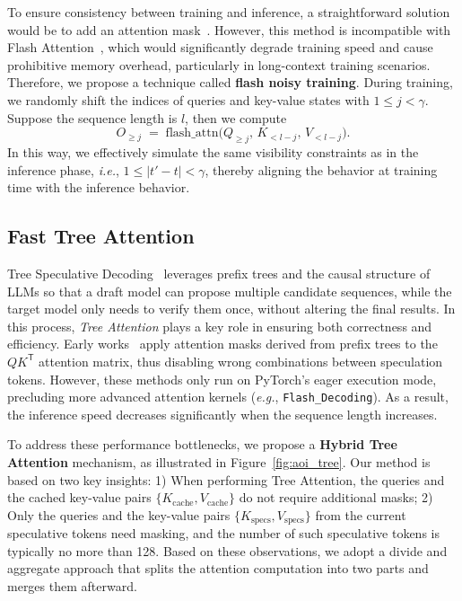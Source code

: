 To ensure consistency between training and inference, a straightforward solution would be to add an attention mask~\cite{du2024glide}. However, this method is incompatible with Flash Attention~\cite{dao2023flash}, which would significantly degrade training speed and cause prohibitive memory overhead, particularly in long-context training scenarios. Therefore, we propose a technique called \textbf{flash noisy training}. During training, we randomly shift the indices of queries and key-value states with $1 \le j < \gamma$. 
Suppose the sequence length is $l$, then we compute
\[
    O_{\geq j} 
    \;=\; \mathrm{flash\_attn}\bigl(Q_{\geq j}, \,K_{< l-j}, \,V_{< l-j}\bigr).
\]
In this way, we effectively simulate the same visibility constraints as in the inference phase, \emph{i.e.}, 
$ 1\le|t' - t|<\gamma$,
thereby aligning the behavior at training time with the inference behavior.

\subsection{Fast Tree Attention}

\label{subsec: tree attention}
Tree Speculative Decoding~\cite{miao2024specinfer} leverages prefix trees and the causal structure of LLMs so that a draft model can propose multiple candidate sequences, while the target model only needs to verify them once, without altering the final results. 
In this process, \emph{Tree Attention} plays a key role in ensuring both correctness and efficiency. Early works~\citep{cai2024medusa, li2024eagle} apply attention masks derived from prefix trees to the $QK^\mathsf{T}$ attention matrix, thus disabling wrong combinations between speculation tokens.
However, these methods only run on PyTorch’s eager execution mode, precluding more advanced attention kernels (\emph{e.g.}, \texttt{Flash\_Decoding}).
As a result, the inference speed decreases significantly when the sequence length increases.

To address these performance bottlenecks, we propose a \textbf{Hybrid Tree Attention} mechanism, as illustrated in Figure~\ref{fig:aoi_tree}. Our method is based on two key insights: 1) When performing Tree Attention, the queries and the cached key-value pairs $\{K_{\mathrm{cache}}, V_{\mathrm{cache}}\}$ do not require additional masks; 2) Only the queries and the key-value pairs $\{K_{\mathrm{specs}}, V_{\mathrm{specs}}\}$ from the current speculative tokens need masking, and the number of such speculative tokens is typically no more than 128.
Based on these observations, we adopt a divide and aggregate approach that splits the attention computation into two parts and merges them afterward.

